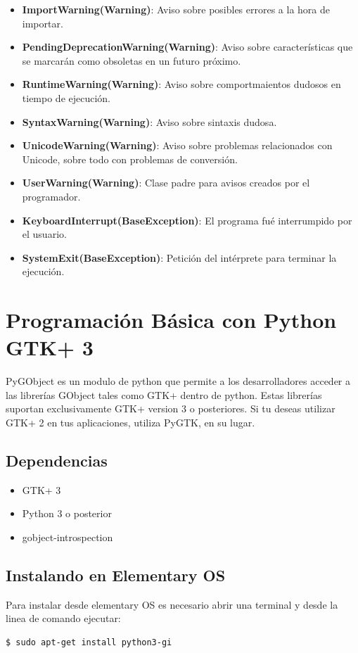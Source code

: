 \documentclass[12pt, twoside]{report}
\begin{document}
\begin{itemize}
	\item \textbf{ImportWarning(Warning)}: Aviso sobre posibles errores a la hora de importar.
	\item \textbf{PendingDeprecationWarning(Warning)}: Aviso sobre características que se marcarán como obsoletas en un futuro próximo.
	\item \textbf{RuntimeWarning(Warning)}: Aviso sobre comportmaientos dudosos en tiempo de ejecución.
	\item \textbf{SyntaxWarning(Warning)}: Aviso sobre sintaxis dudosa.
	\item \textbf{UnicodeWarning(Warning)}: Aviso sobre problemas relacionados con Unicode, sobre todo con problemas de conversión.
	\item \textbf{UserWarning(Warning)}: Clase padre para avisos creados por el programador.
	\item \textbf{KeyboardInterrupt(BaseException)}: El programa fué interrumpido por el usuario.
	\item \textbf{SystemExit(BaseException)}: Petición del intérprete para terminar la ejecución.
\end{itemize}

\chapter{Programación Básica con Python GTK+ 3}

PyGObject es un modulo de python que permite a los desarrolladores acceder a las librerías GObject tales como GTK+ dentro de python. Estas librerías suportan exclusivamente GTK+ version 3 o posteriores. Si tu deseas utilizar GTK+ 2 en tus aplicaciones, utiliza PyGTK, en su lugar.

\section{Dependencias}
\begin{itemize}
	\item GTK+ 3
	\item Python 3 o posterior
	\item gobject-introspection
\end{itemize}

\section{Instalando en Elementary OS}

Para instalar desde elementary OS es necesario abrir una terminal y desde la linea de comando ejecutar:
\begin{lstlisting}[language=bash]
$ sudo apt-get install python3-gi
\end{lstlisting}
\end{document}
